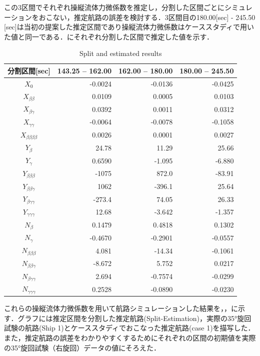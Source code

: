 この3区間でそれぞれ操縦流体力微係数を推定し，分割した区間ごとにシミュレーションをおこない，推定航路の誤差を検討する．3区間目の180.00[sec] - 245.50 [sec]は当初の提案した推定区間であり操縦流体力微係数はケーススタディで用いた値と同一である．にそれぞれ分割した区間で推定した値を示す．

\begin{table}[htbp]
 \caption{Split and estimated results}
 \label{tb:5-1}
 \centering
  \begin{tabular}{crrr}
   \hline
   分割区間[sec] & 143.25 – 162.00 & 162.00 – 180.00 & 180.00 – 245.50 \\
   \hline \hline
   $X_0$ & -0.0024 & -0.0136 & -0.0425 \\
   $X_{\beta\beta}$ & 0.0109 & 0.0005 & 0.0103 \\
   $X_{\beta\gamma}$ & 0.0392 & 0.0011 & 0.0312 \\
   $X_{\gamma\gamma}$ & -0.0064 & -0.0078 & -0.1058 \\
   $X_{\beta\beta\beta\beta}$ & 0.0026 & 0.0001 & 0.0027 \\
   $Y_{\beta}$ & 24.78 & 11.29 & 25.66 \\
   $Y_{\gamma}$ & 0.6590 & -1.095 & -6.880 \\
   $Y_{\beta\beta\beta}$ & -1075 & 872.0 & -83.91 \\
   $Y_{\beta\beta\gamma}$ & 1062 & -396.1 & 25.64 \\
   $Y_{\beta\gamma\gamma}$ & -273.4 & 74.05 & 26.33 \\
   $Y_{\gamma\gamma\gamma}$ & 12.68 & -3.642 & -1.357 \\
   $N_{\beta}$ & 0.1479 & 0.4818 & 0.1302 \\
   $N_{\gamma}$ & -0.4670 & -0.2901 & -0.0557 \\
   $N_{\beta\beta\beta}$ & 4.081 & -14.34 & -0.1061 \\
   $N_{\beta\beta\gamma}$ & -8.672 & 5.752 & 0.0217 \\
   $N_{\beta\gamma\gamma}$ & 2.694 & -0.7574 & -0.0299 \\
   $N_{\gamma\gamma\gamma}$ & 0.2528 & -0.0890 & -0.0230 \\
   \hline
  \end{tabular}
\end{table}

これらの操縦流体力微係数を用いて航路シミュレーションした結果を，，に示す．グラフには推定区間を分割した推定航路(Split-Estimation)，実際の35°旋回試験の航路(Ship 1)とケーススタディでおこなった推定航路(case 1)を描写した．また，推定航路の誤差をわかりやすくするためにそれぞれの区間の初期値を実際の35°旋回試験（右旋回）データの値にそろえた．

